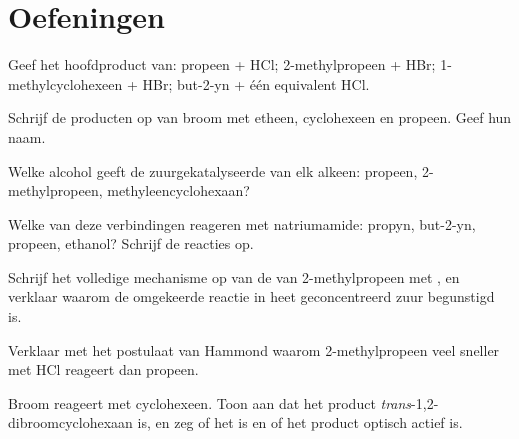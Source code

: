 \section{Oefeningen}

\begin{exercise}[$\star$]\label{exo:b1:electrophilic-additions:1}
Geef het hoofdproduct van: propeen + HCl; 2-methylpropeen + HBr;
1-methylcyclohexeen + HBr; but-2-yn + één equivalent HCl.
\end{exercise}

\begin{exercise}[$\star$]\label{exo:b1:electrophilic-additions:2}
Schrijf de producten op van broom met etheen, cyclohexeen en propeen.
Geef hun naam.
\end{exercise}

\begin{exercise}[$\star$]\label{exo:b1:electrophilic-additions:3}
Welke alcohol geeft de zuurgekatalyseerde  van elk alkeen:
propeen, 2-methylpropeen, methyleencyclohexaan?
\end{exercise}

\begin{exercise}[$\star$]\label{exo:b1:electrophilic-additions:4}
Welke van deze verbindingen reageren met natriumamide: propyn, but-2-yn,
propeen, ethanol? Schrijf de reacties op.
\end{exercise}

\begin{exercise}[$\star\star$]\label{exo:b1:electrophilic-additions:5}
Schrijf het volledige mechanisme op van de  van
2-methylpropeen met , en verklaar waarom de omgekeerde
reactie in heet geconcentreerd zuur begunstigd is.
\end{exercise}

\begin{exercise}[$\star\star$]\label{exo:b1:electrophilic-additions:6}
Verklaar met het postulaat van Hammond waarom 2-methylpropeen veel
sneller met HCl reageert dan propeen.
\end{exercise}

\begin{exercise}[$\star\star$]\label{exo:b1:electrophilic-additions:7}
Broom reageert met cyclohexeen. Toon aan dat het product
\textit{trans}-1,2-dibroomcyclohexaan is, en zeg of het  is en of
het product optisch actief is.
\end{exercise}

